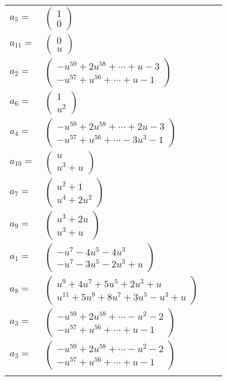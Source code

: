 \documentclass[1p]{elsarticle_modified}
\theoremstyle{definition}
\begin{document}
\begin{tabular}{m{7pt} m{180pt} m{7pt} m{180pt} }
\flushright $a_{5}=$&$\begin{pmatrix}1\\0\end{pmatrix}$ \\
\flushright $a_{11}=$&$\begin{pmatrix}0\\u\end{pmatrix}$ \\
\flushright $a_{2}=$&$\begin{pmatrix}- u^{59}+2 u^{58}+\cdots+u-3\\- u^{57}+u^{56}+\cdots+u-1\end{pmatrix}$ \\
\flushright $a_{6}=$&$\begin{pmatrix}1\\u^2\end{pmatrix}$ \\
\flushright $a_{4}=$&$\begin{pmatrix}- u^{59}+2 u^{58}+\cdots+2 u-3\\- u^{57}+u^{56}+\cdots-3 u^3-1\end{pmatrix}$ \\
\flushright $a_{10}=$&$\begin{pmatrix}u\\u^3+u\end{pmatrix}$ \\
\flushright $a_{7}=$&$\begin{pmatrix}u^2+1\\u^4+2 u^2\end{pmatrix}$ \\
\flushright $a_{9}=$&$\begin{pmatrix}u^3+2 u\\u^3+u\end{pmatrix}$ \\
\flushright $a_{1}=$&$\begin{pmatrix}- u^7-4 u^5-4 u^3\\- u^7-3 u^5-2 u^3+u\end{pmatrix}$ \\
\flushright $a_{8}=$&$\begin{pmatrix}u^9+4 u^7+5 u^5+2 u^3+u\\u^{11}+5 u^9+8 u^7+3 u^5- u^3+u\end{pmatrix}$ \\
\flushright $a_{3}=$&$\begin{pmatrix}- u^{59}+2 u^{58}+\cdots- u^2-2\\- u^{57}+u^{56}+\cdots+u-1\end{pmatrix}$\\ \flushright $a_{3}=$&$\begin{pmatrix}- u^{59}+2 u^{58}+\cdots- u^2-2\\- u^{57}+u^{56}+\cdots+u-1\end{pmatrix}$\\&\end{tabular}
\end{document}
